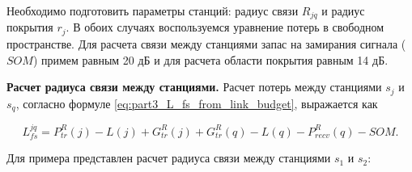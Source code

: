 










Необходимо подготовить параметры станций: радиус связи $R_{jq}$ и радиус покрытия $r_j$. В обоих случаях воспользуемся уравнение потерь в свободном пространстве. Для расчета связи между станциями запас на замирания сигнала ($SOM$) примем равным 20 дБ и для расчета области покрытия равным 14 дБ.

\textbf{Расчет радиуса связи между станциями.}
Расчет потерь между станциями $s_j$ и $s_q$, согласно формуле \cref{eq:part3_L_fs_from_link_budget}, выражается как


\begin{displaymath}
  L_{fs}^{jq} = P_{tr}^R(j) - L(j) + G_{tr}^R(j) + G_{tr}^R(q) - L(q) - P_{recv}^R(q) - SOM.
\end{displaymath}


Для примера представлен расчет радиуса связи между станциями $s_1 $ и $ s_2 $:


